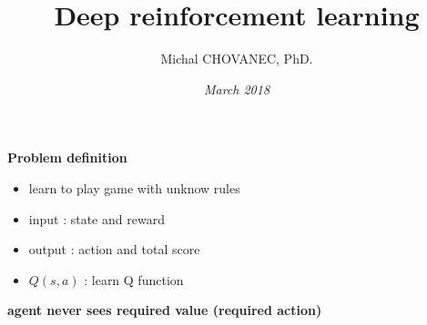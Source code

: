 \documentclass[xcolor=dvipsnames]{beamer}
\title{\bf Deep reinforcement learning}
\author{Michal CHOVANEC, PhD.}
\date[EURP]{\it March 2018}
\begin{document}
\begin{frame}
\titlepage
{}
\end{frame}


\begin{frame}{\bf Problem definition}
\begin{itemize}
 \item learn to play game with unknow rules
 \item input  : state and reward
 \item output : action and total score
 \item $Q(s, a)$ : learn Q function
\end{itemize}
\centering

{\color{red} \bf agent never sees required value (required action)}



\end{frame}
\end{document}
